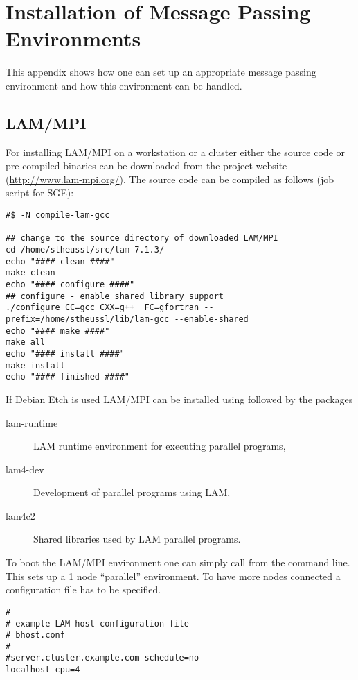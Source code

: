 
\section{Installation of Message Passing Environments}
\label{app:mpi_imp}

This appendix shows how one can set up an appropriate message
passing environment and how this environment can be handled.

\subsection{LAM/MPI}

For installing LAM/MPI on a workstation or a cluster
either the source code or pre-compiled binaries can be downloaded from
the project website (\url{http://www.lam-mpi.org/}).
The source code can be compiled as follows (job script for SGE):

\begin{verbatim}
#$ -N compile-lam-gcc

## change to the source directory of downloaded LAM/MPI
cd /home/stheussl/src/lam-7.1.3/
echo "#### clean ####"
make clean
echo "#### configure ####"
## configure - enable shared library support
./configure CC=gcc CXX=g++  FC=gfortran --prefix=/home/stheussl/lib/lam-gcc --enable-shared
echo "#### make ####"
make all
echo "#### install ####"
make install
echo "#### finished ####"
\end{verbatim}

If Debian Etch is used LAM/MPI can be installed using  followed by the packages

\begin{description}
\item[lam-runtime] LAM runtime environment for executing parallel programs,
\item[lam4-dev] Development of parallel programs using LAM,
\item[lam4c2] Shared libraries used by LAM parallel programs.
\end{description}

To boot the LAM/MPI environment one can simply call 
from the command line. This sets up a 1 node ``parallel''
environment. To have more nodes connected a configuration file has to
be specified.

\begin{verbatim}
#
# example LAM host configuration file
# bhost.conf
#
#server.cluster.example.com schedule=no
localhost cpu=4
\end{verbatim}

